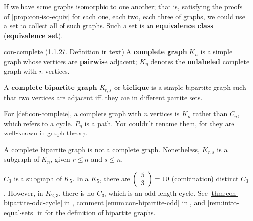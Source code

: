 \documentclass[../src/handouts/main.tex]{subfiles}
\begin{document}
If we have some graphs isomorphic to one another; that is, satisfying the proofs of \cref{prop:con-iso-equiv} for each one, each two, each three of graphs, we could use a set to collect all of such graphs. Such a set is an \textbf{equivalence class} (\textbf{equivalence set}). 

\begin{definition}{}{con-complete}
  (1.1.27. Definition in text)
  A \textbf{complete graph} $K_n$ is a simple graph whose vertices are \textbf{pairwise} adjacent; $K_n$ denotes the \textbf{unlabeled} complete graph with $n$ vertices.

  A \textbf{complete bipartite graph} $K_{r,s}$ or \textbf{biclique} is a simple bipartite graph such that two vertices are adjacent iff. they are in different partite sets.
\end{definition}

For \cref{def:con-complete}, a complete graph with $n$ vertices is $K_n$ rather than $C_n$, which refers to a cycle. $P_n$ is a path. You couldn't rename them, for they are well-known in graph theory.

A complete bipartite graph is not a complete graph. Nonetheless, $K_{r,s}$ is a subgraph of $K_n$, given $r \leq n$ and $s \leq n$.

$C_3$ is a subgraph of $K_5$. In a $K_5$, there are $ \left( \begin{array}{c} 5 \\ 3 \end{array} \right)  = 10$ (combination) distinct $C_3$. However, in $K_{2,3}$, there is no $C_3$, which is an odd-length cycle. See \cref{thm:con-bipartite-odd-cycle} in , comment \ref{enum:con-bipartite-odd} in , and \cref{rem:intro-equal-sets} in  for the definition of bipartite graphs.
\end{document}

